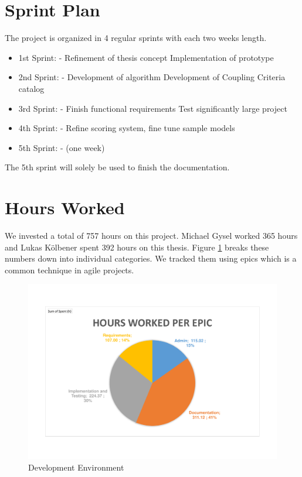 \section{Sprint Plan}
\label{sec:projplan}

The project is organized in 4 regular sprints with each two weeks length. 

\begin{itemize}
\item 1st Sprint:  - 
\subitem Refinement of thesis concept
\subitem Implementation of prototype
\item 2nd Sprint:  - 
\subitem Development of algorithm
\subitem Development of Coupling Criteria catalog
\item 3rd Sprint:  - 
\subitem Finish functional requirements
\subitem Test significantly large project
\item 4th Sprint:  - 
\subitem Refine scoring system, fine tune sample models
\item 5th Sprint:  -  (one week)
\end{itemize}

The 5th sprint will solely be used to finish the documentation.


\section{Hours Worked}

We invested a total of 757 hours on this project. Michael Gysel worked 365 hours and Lukas Kölbener spent 392 hours on this thesis. Figure \ref{fig:hoursworked} breaks these numbers down into individual categories. We tracked them using epics which is a common technique in agile projects.

\begin{figure}[H]
	\includegraphics[scale=0.7]{diagrams/hoursperepic.pdf}
	\caption{Development Environment}
	\label{fig:hoursworked}
\end{figure}
